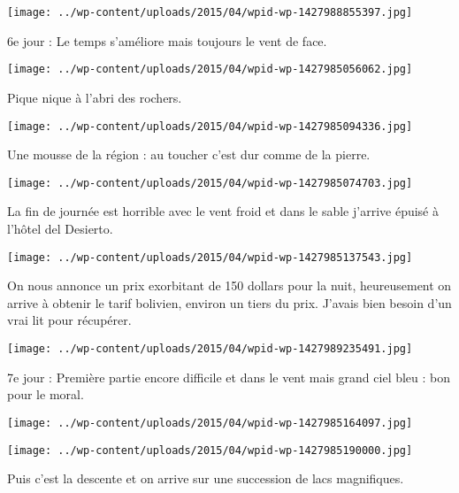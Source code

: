 \centerline{\texttt{[image: ../wp-content/uploads/2015/04/wpid-wp-1427988855397.jpg]} } 
 \newline
 6e jour : \newline
 Le temps s'améliore mais toujours le vent de face. \newline
 \newline
\centerline{\texttt{[image: ../wp-content/uploads/2015/04/wpid-wp-1427985056062.jpg]} } 
 \newline
 Pique nique à l'abri des rochers. \newline
 \newline
\centerline{\texttt{[image: ../wp-content/uploads/2015/04/wpid-wp-1427985094336.jpg]} } 
 \newline
 Une mousse de la région : au toucher c'est dur comme de la pierre. \newline
 \newline
\centerline{\texttt{[image: ../wp-content/uploads/2015/04/wpid-wp-1427985074703.jpg]} } 
 \newline
 La fin de journée est horrible avec le vent froid et dans le sable j'arrive épuisé à l'hôtel del Desierto. \newline
 \newline
\centerline{\texttt{[image: ../wp-content/uploads/2015/04/wpid-wp-1427985137543.jpg]} } 
 \newline
 On nous annonce un prix exorbitant de 150 dollars pour la nuit, heureusement on arrive à obtenir le tarif bolivien, environ un tiers du prix. J'avais bien besoin d'un vrai lit pour récupérer. \newline
 \newline
\centerline{\texttt{[image: ../wp-content/uploads/2015/04/wpid-wp-1427989235491.jpg]} } 
 \newline
 7e jour : \newline
 Première partie encore difficile et dans le vent mais grand ciel bleu : bon pour le moral. \newline
 \newline
\centerline{\texttt{[image: ../wp-content/uploads/2015/04/wpid-wp-1427985164097.jpg]} } 
 \newline
 \newline
\centerline{\texttt{[image: ../wp-content/uploads/2015/04/wpid-wp-1427985190000.jpg]} } 
 \newline
 Puis c'est la descente et on arrive sur une succession de lacs magnifiques. \newline
